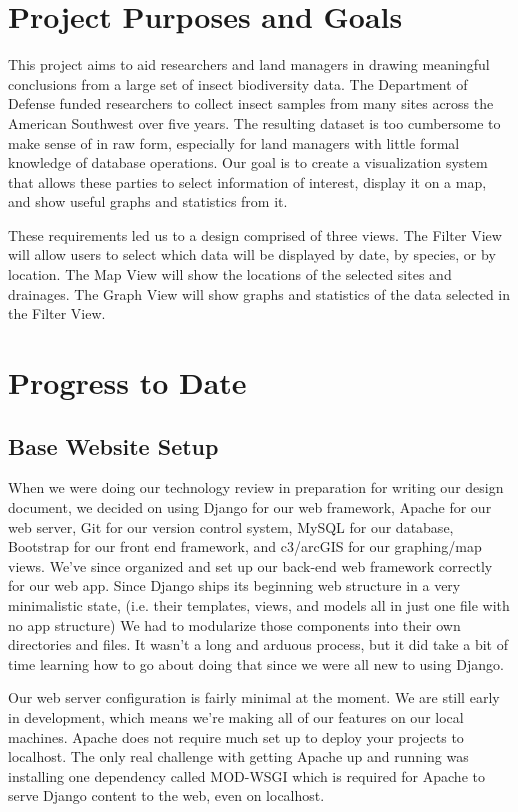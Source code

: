 \documentclass[10pt,journal,onecolumn,draftclsnofoot]{IEEEtran}
\begin{document}
\section{Project Purposes and Goals} %
This project aims to aid researchers and land managers in drawing meaningful
conclusions from a large set of insect biodiversity data. The Department of
Defense funded researchers to collect insect samples from many sites across the
American Southwest over five years. The resulting dataset is too cumbersome to
make sense of in raw form, especially for land managers with little formal
knowledge of database operations. Our goal is to create a visualization system
that allows these parties to select information of interest, display it on a
map, and show useful graphs and statistics from it.


These requirements led us to a design comprised of three views. The Filter
View will allow users to select which data will be displayed by date, by
species, or by location. The Map View will show the locations of the selected
sites and drainages. The Graph View will show graphs and statistics of the data
selected in the Filter View.


\section{Progress to Date}

\subsection{Base Website Setup} %
When we were doing our technology review in preparation for writing our design document, we decided on using Django for our web framework, Apache for our web server, Git for our version control system, MySQL for our database, Bootstrap for our front end framework, and c3/arcGIS for our graphing/map views.
We’ve since organized and set up our back-end web framework correctly for our web app.
Since Django ships its beginning web structure in a very minimalistic state, (i.e. their templates, views, and models all in just one file with no app structure) We had to modularize those components into their own directories and files.
It wasn’t a long and arduous process, but it did take a bit of time learning how to go about doing that since we were all new to using Django.

Our web server configuration is fairly minimal at the moment.
We are still early in development, which means we’re making all of our features on our local machines.
Apache does not require much set up to deploy your projects to localhost.
The only real challenge with getting Apache up and running was installing one dependency called MOD-WSGI which is required for Apache to serve Django content to the web, even on localhost.
\end{document}
